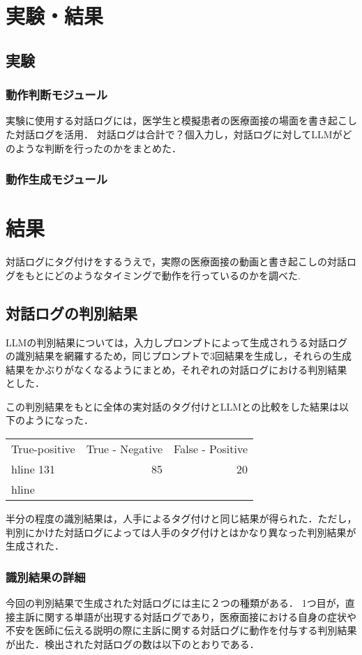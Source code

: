 \section{実験・結果}\label{result}

\subsection{実験}
\subsubsection*{動作判断モジュール}
実験に使用する対話ログには，医学生と模擬患者の医療面接の場面を書き起こした対話ログを活用．
対話ログは合計で？個入力し，対話ログに対してLLMがどのような判断を行ったのかをまとめた．

\subsubsection*{動作生成モジュール}

\section{結果}
対話ログにタグ付けをするうえで，実際の医療面接の動画と書き起こしの対話ログをもとにどのようなタイミングで動作を行っているのかを調べた.


\subsection{対話ログの判別結果}
LLMの判別結果については，入力しプロンプトによって生成されうる対話ログの識別結果を網羅するため，同じプロンプトで3回結果を生成し，それらの生成結果をかぶりがなくなるようにまとめ，それぞれの対話ログにおける判別結果
とした．

この判別結果をもとに全体の実対話のタグ付けとLLMとの比較をした結果は以下のようになった．
\begin{tabular}{|l|r|r|} \hline
True-positive & True - Negative & False - Positive \\hline
131 & 85 & 20 \\hline
\end {tabular}

半分の程度の識別結果は，人手によるタグ付けと同じ結果が得られた．ただし，判別にかけた対話ログによっては人手のタグ付けとはかなり異なった判別結果が生成された．

\subsubsection {識別結果の詳細}
今回の判別結果で生成された対話ログには主に２つの種類がある．
1つ目が，直接主訴に関する単語が出現する対話ログであり，医療面接における自身の症状や不安を医師に伝える説明の際に主訴に関する対話ログに動作を付与する判別結果が出た．検出された対話ログの数は以下のとおりである．

